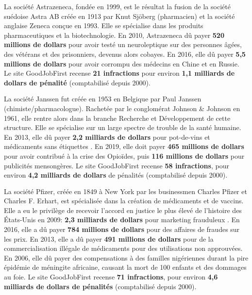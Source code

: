 \documentclass[a4paper]{article}
\begin{document}
\begin{multicols}{3}
  La société Astrazeneca, fondée en 1999, est le résultat la fusion de
  la société suédoise Astra AB créée en 1913 par Knut Sjöberg
  (pharmacien) et la société anglaise Zeneca conçue en 1993. Elle se
  spécialise dans les produits pharmaceutiques et la
  biotechnologie. En 2010, Astrazeneca dû payer \textbf{520 millions
    de dollars} pour avoir testé un neuroleptique
  \cite{Justice:Astrazeneca2010} sur des personnes âgées, des vétérans
  et des prisonniers, devenus alors cobayes. En 2016, elle dû payer
  \textbf{5,5 millions de dollars} pour avoir corrompu des médecins en
  Chine et en Russie. Le site GoodJobFirst
  \cite{GoodJobFirst:Astrazeneca} recense \textbf{21 infractions} pour
  environ \textbf{1,1 milliards de dollars de pénalité} (comptabilisé
  depuis 2000).

  La société Janssen fut créée en 1953 en Belgique par Paul Janssen
  (chimiste/pharmacologue). Rachetée par le conglomérat Johnson \&
  Johnson en 1961, elle rentre alors dans la branche Recherche et
  Développement de cette structure. Elle se spécialise sur un large
  spectre de trouble de la santé humaine. En 2013, elle dû payer
  \textbf{2,2 milliards de dollars} pour pot-de-vins et médicaments
  sans étiquettes \cite{Justice:JohnsonJohnson2013}. En 2019, elle
  doit payer \textbf{465 millions de dollars} pour avoir contribué à
  la crise des Opioïdes\cite{Justice:JohnsonJohnson2019}, puis
  \textbf{116 millions de dollars} pour publicités
  mensongères\cite{Justice:JohnsonJohnson2019-2}. Le site GoodJobFirst
  \cite{GoodJobFirst:JohnsonJohnson} recense \textbf{58 infractions},
  pour environ \textbf{4,2 milliards de dollars} de pénalités
  (comptabilisé depuis 2000).

  La société Pfizer, créée en 1849 à New York par les businessmen
  Charles Pfizer et Charles F. Erhart, est spécialisée dans la
  création de médicaments et de vaccins. Elle a eu le privilège de
  recevoir l'accord en justice le plus élevé de l'histoire des
  États-Unis en 2009: \textbf{2,3 milliards de dollars} pour marketing
  frauduleux \cite{Justice:Pfizer2009}. En 2016, elle a dû payer
  \textbf{784 millions de dollars} pour des affaires de fraudes sur
  les prix\cite{Justice:Pfizer2016}. En 2013, elle a dû payer
  \textbf{491 millions de dollars} pour de la commercialisation
  illégale de médicaments pour des utilisations non
  approuvées\cite{Justice:Pfizer2013}. En 2006, elle dû payer des
  compensations à des familles nigériennes durant la pire épidémie de
  méningite africaine, causant la mort de 100 enfants et des dommages
  au foie\cite{Justice:Pfizer2006}. Le site GoodJobFirst
  \cite{GoodJobFirst:Pfizer} recense \textbf{71 infractions}, pour
  environ \textbf{4,6 milliards de dollars de pénalités} (comptabilisé
  depuis 2000).


\end{multicols}
\end{document}
